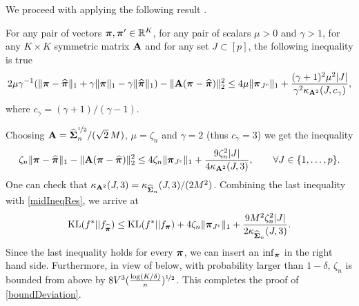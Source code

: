 We proceed with applying the following result \citep[Lemma 2]{BDGP}.

\begin{lemma}
	For any pair of vectors $\boldsymbol \pi,\boldsymbol \pi'\in{\mathbb R}^K$, for any pair of scalars $\mu>0$ and $\gamma>1$, for any $K\times K$
	symmetric matrix $\mathbf A$ and for any set $J \subset [p]$, the following inequality is true
	\begin{equation}
	2\mu\gamma^{-1}(\| \boldsymbol \pi-\widehat{\boldsymbol \pi}\|_1 + \gamma \|\boldsymbol \pi\|_1 - \gamma \|\widehat{\boldsymbol \pi}\|_1 )-\|\mathbf A(\boldsymbol \pi-\widehat{\boldsymbol \pi})\|_2^2 \leq
	4\mu \| \boldsymbol \pi_{J^c}\|_1 + \frac{(\gamma+1)^2\mu^2|J|}{\gamma^2\kappa_{\mathbf A^2}(J,c_{\gamma})},
	\end{equation}
	where $c_{\gamma}=(\gamma+1)/(\gamma-1)$.
\end{lemma}


Choosing $\mathbf A = \widehat{\boldsymbol\Sigma}_n^{\nicefrac12}/(\sqrt{2}\,M)$, $\mu=\zeta_n$ and $\gamma=2$ (thus $c_\gamma = 3$)
we get the inequality
\begin{equation}
\zeta_n\| \boldsymbol \pi-\widehat{\boldsymbol \pi}\|_1-\|\mathbf A(\boldsymbol \pi-\widehat{\boldsymbol \pi})\|_2^2 \leq
4\zeta_n\| \boldsymbol \pi_{J^c}\|_1 + \frac{9\zeta_n^2|J|}{4\kappa_{\mathbf A^2}(J,3)},\qquad \forall J \in \{1, \dots, p\}.
\end{equation}
One can check that $\kappa_{\mathbf A^2}(J,3) = \kappa_{\widehat{\boldsymbol\Sigma}_n}(J,3)/(2M^2)$.
Combining the last inequality with \eqref{midIneqRes}, we arrive at
\begin{equation}
\label{oracleIneqTh}
{\rm KL}(f^*|| f_{\widehat{\boldsymbol \pi}}) \leq {\rm KL}(f^*|| f_{\boldsymbol \pi}) + 4\zeta_n\| \boldsymbol \pi_{J^c}\|_1 + \frac{9M^2\zeta_n^2|J|}{2\kappa_{\widehat{\boldsymbol\Sigma}_n}(J,3)}.
\end{equation}
Since the last inequality holds for every $\boldsymbol \pi$, we can insert an $\inf_{\boldsymbol \pi}$ in the right hand side.
Furthermore, in view of  below, with probability larger than $1-\delta$, $\zeta_n$ is bounded from above
by $8V^3(\frac{\log(K/\delta)}{n})^{\nicefrac12}$. This completes the proof of \eqref{boundDeviation}.

